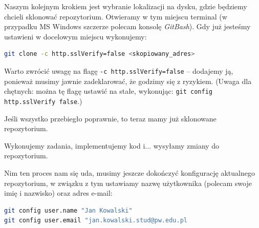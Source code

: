 \documentclass[twoside]{article}
\begin{document}
Naszym kolejnym krokiem jest wybranie lokalizacji na dysku, gdzie będziemy chcieli sklonować
repozytorium.
Otwieramy w tym miejscu terminal (w przypadku MS Windows szczerze polecam konsolę \textit{GitBash}).
Gdy już jesteśmy ustawieni w docelowym miejscu wykonujemy:

\begin{lstlisting}[frame=single,language=bash] 
git clone -c http.sslVerify=false <skopiowany_adres>
\end{lstlisting}

Warto zwrócić uwagę na flagę \verb|-c http.sslVerify=false| -- dodajemy ją, ponieważ musimy
jawnie zadeklarować, że godzimy się z ryzykiem.
(Uwaga dla chętnych: można tę flagę ustawić na stałe, wykonując: 
\newline
\verb|git config http.sslVerify false|.)

Jeśli wszystko przebiegło poprawnie, to teraz mamy już sklonowane repozytorium.

Wykonujemy zadania, implementujemy kod i... wysyłamy zmiany do repozytorium.

Nim ten proces nam się uda, musimy jeszcze dokończyć konfigurację aktualnego repozytorium,
w związku z tym ustawiamy nazwę użytkownika (polecam swoje imię i nazwisko) oraz adres e-mail:

\begin{lstlisting}[frame=single,language=bash] 
git config user.name "Jan Kowalski"
git config user.email "jan.kowalski.stud@pw.edu.pl
\end{lstlisting}
\end{document}
